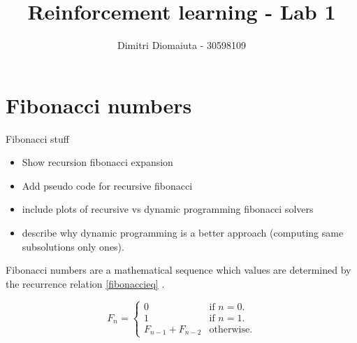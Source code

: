 \documentclass[runningheads]{llncs}
\begin{document}
%
\title{Reinforcement learning - Lab 1}
%
%
\author{Dimitri Diomaiuta - 30598109}
%
%
%
\maketitle              %
%
%
%
%

\section{Fibonacci numbers}
Fibonacci stuff
\begin{itemize}
\item Show recursion fibonacci expansion
\item Add pseudo code for recursive fibonacci
\item include plots of recursive vs dynamic programming fibonacci
  solvers
\item describe why dynamic programming is a better approach (computing
  same subsolutions only ones).
\end{itemize}

Fibonacci numbers are a mathematical sequence which values are
determined by the recurrence relation \ref{fibonaccieq}
\cite{fib_num}. 

\begin{equation}\label{fibonaccieq}
  F_n=\begin{cases}
  0 & \text{if $n=0$}.\\
  1 & \text{if $n=1$}.\\
  F_{n-1} + F_{n-2} & \text{otherwise}.
  \end{cases}
\end{equation}
\end{document}
